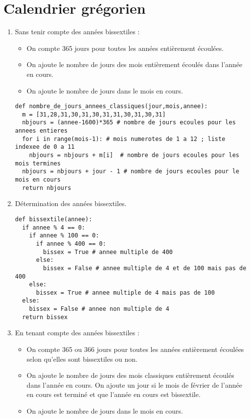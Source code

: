 \newpage
\section{Calendrier grégorien}

\begin{enumerate}
 \item Sans tenir compte des années bissextiles :
 \begin{itemize}
  \item On compte 365 jours pour toutes les années entièrement écoulées. 
  \item On ajoute le nombre de jours des mois entièrement écoulés dans l'année en cours. 
  \item On ajoute le nombre de jours dans le mois en cours.                                                                                                                                                                                                           \end{itemize}

\begin{verbatim}
def nombre_de_jours_annees_classiques(jour,mois,annee):
  m = [31,28,31,30,31,30,31,31,30,31,30,31]
  nbjours = (annee-1600)*365 # nombre de jours ecoules pour les annees entieres
  for i in range(mois-1): # mois numerotes de 1 a 12 ; liste indexee de 0 a 11
    nbjours = nbjours + m[i]  # nombre de jours ecoules pour les mois termines
  nbjours = nbjours + jour - 1 # nombre de jours ecoules pour le mois en cours
  return nbjours
\end{verbatim}

 \item Détermination des années bissextiles.

\begin{verbatim}
def bissextile(annee):
  if annee % 4 == 0:
    if annee % 100 == 0:
      if annee % 400 == 0: 
        bissex = True # annee multiple de 400
      else:
        bissex = False # annee multiple de 4 et de 100 mais pas de 400
    else:
      bissex = True # annee multiple de 4 mais pas de 100
  else:
    bissex = False # annee non multiple de 4
  return bissex
\end{verbatim}

 \item En tenant compte des années bissextiles :
 \begin{itemize}
  \item On compte 365 ou 366 jours pour toutes les années entièrement écoulées selon qu'elles sont bissextiles ou non. 
  \item On ajoute le nombre de jours des mois classiques entièrement écoulés dans l'année en cours. On ajoute un jour si le mois de février de l'année en cours est terminé et que l'année en cours est bissextile.
  \item On ajoute le nombre de jours dans le mois en cours.
  \end{itemize}


\end{enumerate}
